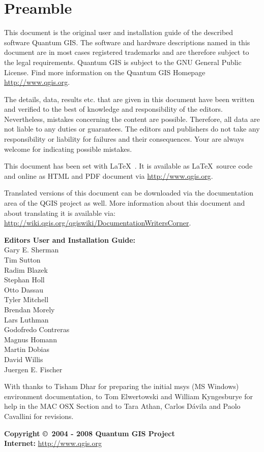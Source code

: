 \thispagestyle{empty}
\section*{Preamble}

\vspace{1cm}

This document is the original user and installation guide of the described 
software Quantum GIS. The software and hardware descriptions named in this 
document are in most cases registered trademarks and are therefore subject 
to the legal requirements. Quantum GIS is subject to the GNU General Public 
License. Find more information on the Quantum GIS Homepage \url{http://www.qgis.org}.

The details, data, results etc. that are given in this document have been 
written and verified to the best of knowledge and responsibility of the 
editors. Nevertheless, mistakes concerning the content are possible. 
Therefore, all data are not liable to any duties or guarantees. The editors 
and publishers do not take any responsibility or liability for failures and 
their consequences. Your are always welcome for indicating possible mistakes.

This document has been set with \LaTeX~. It is available as \LaTeX~source 
code and online as HTML and PDF document via \url{http://www.qgis.org}.

Translated versions of this document can be downloaded via the documentation 
area of the QGIS project as well. More information about this document and 
about translating it is available via: \\
\url{http://wiki.qgis.org/qgiswiki/DocumentationWritersCorner}. 

\begin{flushleft}
\textbf{Editors User and Installation Guide:} 
\\ Gary E. Sherman 
\\ Tim Sutton 
\\ Radim Blazek 
\\ Stephan Holl 
\\ Otto Dassau 
\\ Tyler Mitchell 
\\ Brendan Morely 
\\ Lars Luthman 
\\ Godofredo Contreras 
\\ Magnus Homann
\\ Martin Dobias
\\ David Willis
\\ Juergen E. Fischer

With thanks to Tisham Dhar for preparing the initial msys (MS Windows)
environment documentation, to Tom Elwertowski and William Kyngesburye for
help  in the MAC OSX Section and to Tara Athan, Carlos D\'{a}vila and Paolo
Cavallini for revisions.

\textbf{Copyright \copyright~2004 - 2008 Quantum GIS Project} \\
\textbf{Internet:} \url{http://www.qgis.org}
\end{flushleft}

